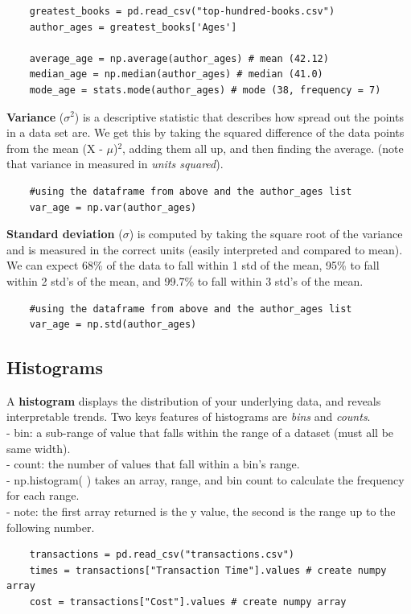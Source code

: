 \documentclass[11pt, a4paper]{article}
\begin{document}
\begin{spacing}{1.1}
\begin{lstlisting}
	greatest_books = pd.read_csv("top-hundred-books.csv")
	author_ages = greatest_books['Ages']
	
	average_age = np.average(author_ages) # mean (42.12)
	median_age = np.median(author_ages) # median (41.0)
	mode_age = stats.mode(author_ages) # mode (38, frequency = 7) \end{lstlisting}\vspace*{1mm}
	\textbf{Variance} ($\sigma^2$) is a descriptive statistic that describes how spread out the points in a data set are. We get this by taking the squared difference of the data points from the mean (X - $\mu$)$^2$, adding them all up, and then finding the average. (note that variance in measured in \textit{units squared}).
	\begin{lstlisting}
	#using the dataframe from above and the author_ages list
	var_age = np.var(author_ages) \end{lstlisting}\vspace*{1mm}
	\textbf{Standard deviation} ($\sigma$) is computed by taking the square root of the variance and is measured in the correct units (easily interpreted and compared to mean). We can expect 68\% of the data to fall within 1 std of the mean, 95\% to fall within 2 std's of the mean, and 99.7\% to fall within 3 std's of the mean.
	\begin{lstlisting}
	#using the dataframe from above and the author_ages list
	var_age = np.std(author_ages) \end{lstlisting}\vspace*{4mm}
	
	\subsection{Histograms}
	A \textbf{histogram} displays the distribution of your underlying data, and reveals interpretable trends. Two keys features of histograms are \textit{bins} and \textit{counts}. \\
	\hspace*{3mm} - bin: a sub-range of value that falls within the range of a dataset (must all be same width). \\
	\hspace*{3mm} - count: the number of values that fall within a bin's range.	\\
	\hspace*{3mm} - np.histogram( ) takes an array, range, and bin count to calculate the frequency for each range. \\
	\hspace*{7mm} - note: the first array returned is the y value, the second is the range up to the following number.
	\begin{lstlisting}
	transactions = pd.read_csv("transactions.csv")
	times = transactions["Transaction Time"].values # create numpy array
	cost = transactions["Cost"].values # create numpy array
	

\end{lstlisting}
\end{spacing}
\end{document}
